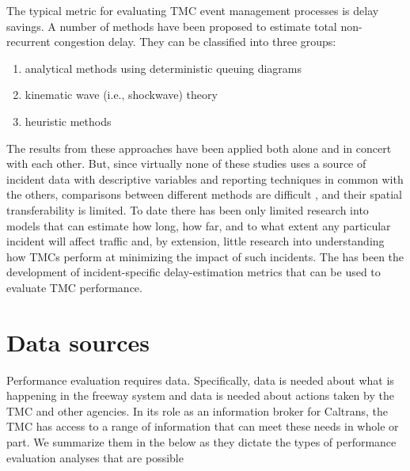 \documentclass[12pt]{report}
\begin{document}
The typical metric for evaluating \ac{TMC} event management processes is
delay savings. A number of methods have been proposed to estimate
total non-recurrent congestion delay.  They can be classified into
three groups:
\begin{enumerate}
\item analytical methods using deterministic queuing diagrams
  \protect\citep[e.g.,]{goolsby71:_influen_of_incid_freew_qualit_of_servic,chow74:_study_of_traff_perfor_model,morales87:_analy_proced_for_estim_freew_traff_conges,trb94:_highw_capac_manual,lawson97:_using_input_output_diagr_to,erera98:_simpl_gener_method_for_analy,skabardonis04:_devel_and_applic_of_method}
\item kinematic wave (i.e., shockwave) theory \citep[e.g.,]{chow74:_study_of_traff_perfor_model,wirasinghe78:_deter_of_traff_delay_from,heydecker94:_incid_and_inter_freew,al-deek95:_new_method_for_estim_freew_incid_conges}
\item heuristic methods \citep[e.g.,]{skabardonis96:_i_field_exper,skabardonis03:_measur_recur_and_nonrec_traff_conges}
\end{enumerate}
The results from these approaches have been applied both alone and in
concert with each other. But, since virtually none of these studies
uses a source of incident data with descriptive variables and
reporting techniques in common with the others, comparisons between
different methods are difficult
\citep{goolsby71:_influen_of_incid_freew_qualit_of_servic}, and their
spatial transferability is limited. To date there has been only
limited research into models that can estimate how long, how far, and
to what extent any particular incident will affect traffic and, by
extension, little research into understanding how \acp{TMC} perform at
minimizing the impact of such incidents.  The  has been the development of
incident-specific delay-estimation metrics that can be used to
evaluate \ac{TMC} performance.


\section{Data sources}
\label{sec:data-sources}

Performance evaluation requires data.  Specifically, data is needed
about what is happening in the freeway system and data is needed about
actions taken by the \ac{TMC} and other agencies.  In its role as an
information broker for Caltrans, the \ac{TMC} has access to a range of
information that can meet these needs in whole or part.  We summarize
them in the below as they dictate the types of performance evaluation
analyses that are possible
\end{document}
